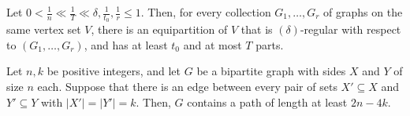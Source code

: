 \documentclass[10pt,a4paper,reqno]{amsart}
\begin{document}
\begin{theorem}  \label{thm:regularity}
Let $0 < \frac{1}{n} \ll \frac{1}{T} \ll \delta, \frac{1}{t_0}, \frac{1}{r} \le 1$. Then, for every collection $G_1,\dots,G_r$ of graphs on the same vertex set $V$, there is an equipartition of $V$ that is $(\delta)$-regular with respect to $(G_1,\dots,G_r)$, and has at least $t_0$ and at most $T$ parts.
\end{theorem}

\begin{lemma}  \label{lem:almost Hamilton path}
Let $n,k$ be positive integers, and let $G$ be a bipartite graph with sides $X$ and $Y$ of size $n$ each. Suppose that there is an edge between every pair of sets $X'\subseteq X$ and $Y'\subseteq Y$ with $|X'| = |Y'| = k$. Then, $G$ contains a path of length at least $2n - 4k$.
\end{lemma}
\end{document}
